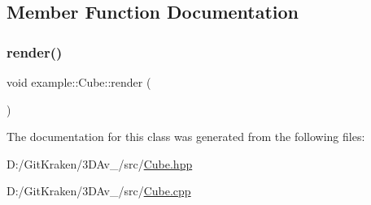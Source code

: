 \subsection{Member Function Documentation}
\mbox{\label{classoglsl_1_1_cube_a9f968872ab6a7ee0362e49a0c5f4e8b6}} 
\subsubsection{\texorpdfstring{render()}{render()}}
{\footnotesize\ttfamily void example\+::\+Cube\+::render (\begin{DoxyParamCaption}{ }\end{DoxyParamCaption})}



The documentation for this class was generated from the following files\+:\begin{DoxyCompactItemize}
\item 
D\+:/\+Git\+Kraken/3\+D\+Av\+\_/src/\mbox{\hyperlink{_cube_8hpp}{Cube.\+hpp}}\item 
D\+:/\+Git\+Kraken/3\+D\+Av\+\_/src/\mbox{\hyperlink{_cube_8cpp}{Cube.\+cpp}}\end{DoxyCompactItemize}
